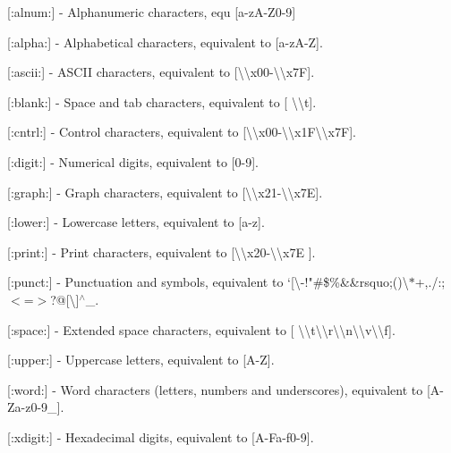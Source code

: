 \begin{DoxyItemize}
\item {\ttfamily \mbox{[}\+:alnum\+:\mbox{]}} -\/ Alphanumeric characters, equ {\ttfamily \mbox{[}a-\/z\+A-\/\+Z0-\/9\mbox{]}}
\item {\ttfamily \mbox{[}\+:alpha\+:\mbox{]}} -\/ Alphabetical characters, equivalent to {\ttfamily \mbox{[}a-\/z\+A-\/Z\mbox{]}}.
\item {\ttfamily \mbox{[}\+:ascii\+:\mbox{]}} -\/ A\+S\+C\+II characters, equivalent to {\ttfamily \mbox{[}\textbackslash{}\textbackslash{}x00-\/\textbackslash{}\textbackslash{}x7F\mbox{]}}.
\item {\ttfamily \mbox{[}\+:blank\+:\mbox{]}} -\/ Space and tab characters, equivalent to {\ttfamily \mbox{[} \textbackslash{}\textbackslash{}t\mbox{]}}.
\item {\ttfamily \mbox{[}\+:cntrl\+:\mbox{]}} -\/ Control characters, equivalent to {\ttfamily \mbox{[}\textbackslash{}\textbackslash{}x00-\/\textbackslash{}\textbackslash{}x1F\textbackslash{}\textbackslash{}x7F\mbox{]}}.
\item {\ttfamily \mbox{[}\+:digit\+:\mbox{]}} -\/ Numerical digits, equivalent to {\ttfamily \mbox{[}0-\/9\mbox{]}}.
\item {\ttfamily \mbox{[}\+:graph\+:\mbox{]}} -\/ Graph characters, equivalent to {\ttfamily \mbox{[}\textbackslash{}\textbackslash{}x21-\/\textbackslash{}\textbackslash{}x7E\mbox{]}}.
\item {\ttfamily \mbox{[}\+:lower\+:\mbox{]}} -\/ Lowercase letters, equivalent to {\ttfamily \mbox{[}a-\/z\mbox{]}}.
\item {\ttfamily \mbox{[}\+:print\+:\mbox{]}} -\/ Print characters, equivalent to {\ttfamily \mbox{[}\textbackslash{}\textbackslash{}x20-\/\textbackslash{}\textbackslash{}x7E \mbox{]}}.
\item {\ttfamily \mbox{[}\+:punct\+:\mbox{]}} -\/ Punctuation and symbols, equivalent to `\mbox{[}\textbackslash{}-\/!"\#\$\%\&\&rsquo;()\textbackslash{}$\ast$+,./\+:;$<$=$>$?@\mbox{[}\textbackslash{}\mbox{]}$^\wedge$\+\_\+{\ttfamily \{$\vert$\}$\sim$\mbox{]}}.
\item {\ttfamily \mbox{[}\+:space\+:\mbox{]}} -\/ Extended space characters, equivalent to {\ttfamily \mbox{[} \textbackslash{}\textbackslash{}t\textbackslash{}\textbackslash{}r\textbackslash{}\textbackslash{}n\textbackslash{}\textbackslash{}v\textbackslash{}\textbackslash{}f\mbox{]}}.
\item {\ttfamily \mbox{[}\+:upper\+:\mbox{]}} -\/ Uppercase letters, equivalent to {\ttfamily \mbox{[}A-\/Z\mbox{]}}.
\item {\ttfamily \mbox{[}\+:word\+:\mbox{]}} -\/ Word characters (letters, numbers and underscores), equivalent to {\ttfamily \mbox{[}A-\/\+Za-\/z0-\/9\+\_\+\mbox{]}}.
\item {\ttfamily \mbox{[}\+:xdigit\+:\mbox{]}} -\/ Hexadecimal digits, equivalent to {\ttfamily \mbox{[}A-\/\+Fa-\/f0-\/9\mbox{]}}.
\end{DoxyItemize}

